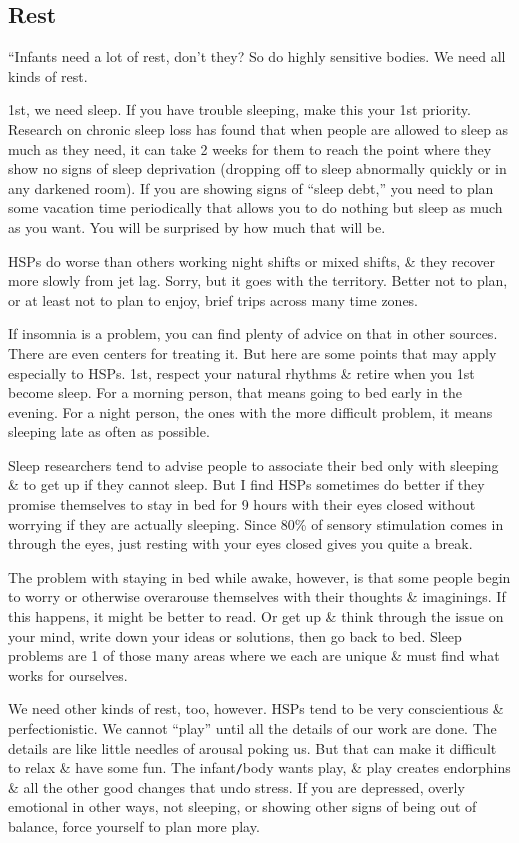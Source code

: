 \documentclass{article}
\numberwithin{equation}{section}
\begin{document}
\subsection{Rest}
``Infants need a lot of rest, don't they? So do highly sensitive bodies. We need all kinds of rest.

1st, we need sleep. If you have trouble sleeping, make this your 1st priority. Research on chronic sleep loss has found that when people are allowed to sleep as much as they need, it can take 2 weeks for them to reach the point where they show no signs of sleep deprivation (dropping off to sleep abnormally quickly or in any darkened room). If you are showing signs of ``sleep debt,'' you need to plan some vacation time periodically that allows you to do nothing but sleep as much as you want. You will be surprised by how much that will be.

HSPs do worse than others working night shifts or mixed shifts, \& they recover more slowly from jet lag. Sorry, but it goes with the territory. Better not to plan, or at least not to plan to enjoy, brief trips across many time zones.

If insomnia is a problem, you can find plenty of advice on that in other sources. There are even centers for treating it. But here are some points that may apply especially to HSPs. 1st, respect your natural rhythms \& retire when you 1st become sleep. For a morning person, that means going to bed early in the evening. For a night person, the ones with the more difficult problem, it means sleeping late as often as possible.

Sleep researchers tend to advise people to associate their bed only with sleeping \& to get up if they cannot sleep. But I find HSPs sometimes do better if they promise themselves to stay in bed for 9 hours with their eyes closed without worrying if they are actually sleeping. Since 80\% of sensory stimulation comes in through the eyes, just resting with your eyes closed gives you quite a break.

The problem with staying in bed while awake, however, is that some people begin to worry or otherwise overarouse themselves with their thoughts \& imaginings. If this happens, it might be better to read. Or get up \& think through the issue on your mind, write down your ideas or solutions, then go back to bed. Sleep problems are 1 of those many areas where we each are unique \& must find what works for ourselves.

We need other kinds of rest, too, however. HSPs tend to be very conscientious \& perfectionistic. We cannot ``play'' until all the details of our work are done. The details are like little needles of arousal poking us. But that can make it difficult to relax \& have some fun. The infant{\tt/}body wants play, \& play creates endorphins \& all the other good changes that undo stress. If you are depressed, overly emotional in other ways, not sleeping, or showing other signs of being out of balance, force yourself to plan more play.
\end{document}
